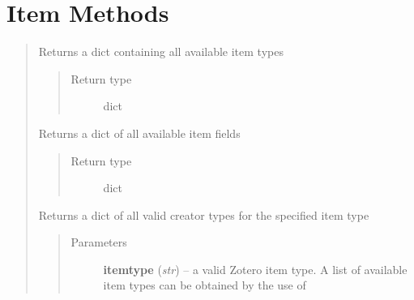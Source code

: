 \documentclass[letterpaper,10pt,english]{sphinxmanual}
\begin{document}
\section{Item Methods}
\label{index:item-methods}\begin{quote}


\begin{fulllineitems}
\label{index:pyzotero.zotero.Zotero.item_types}
Returns a dict containing all available item types
\begin{quote}\begin{description}
\item[{Return type}] \leavevmode
dict

\end{description}\end{quote}

\end{fulllineitems}



\begin{fulllineitems}
\label{index:pyzotero.zotero.Zotero.item_fields}
Returns a dict of all available item fields
\begin{quote}\begin{description}
\item[{Return type}] \leavevmode
dict

\end{description}\end{quote}

\end{fulllineitems}



\begin{fulllineitems}
\label{index:pyzotero.zotero.Zotero.item_creator_types}
Returns a dict of all valid creator types for the specified item type
\begin{quote}\begin{description}
\item[{Parameters}] \leavevmode
\textbf{itemtype} (\emph{str}) -- a valid Zotero item type. A list of available item types can be obtained by the use of {\hyperref[index:pyzotero.zotero.Zotero.item_types]{}}


\end{description}
\end{quote}
\end{fulllineitems}
\end{quote}
\end{document}
